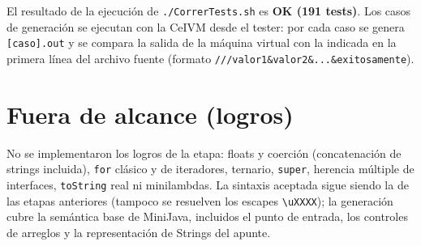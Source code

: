 \documentclass[11pt,a4paper]{article}
\begin{document}
El resultado de la ejecución de \texttt{./CorrerTests.sh} es \textbf{OK (191
tests)}. Los casos de generación se ejecutan con la CeIVM desde el tester: por
cada caso se genera \texttt{[caso].out} y se compara la salida de la máquina
virtual con la indicada en la primera línea del archivo fuente (formato
\texttt{///valor1\&valor2\&...\&exitosamente}).

\section{Fuera de alcance (logros)}

No se implementaron los logros de la etapa: floats y coerción (concatenación de
strings incluida), \texttt{for} clásico y de iteradores, ternario, \texttt{super},
herencia múltiple de interfaces, \texttt{toString} real ni minilambdas. La
sintaxis aceptada sigue siendo la de las etapas anteriores (tampoco se resuelven
los escapes \texttt{\textbackslash uXXXX}); la generación cubre la semántica base
de MiniJava, incluidos el punto de entrada, los controles de arreglos y la
representación de Strings del apunte.
\end{document}
